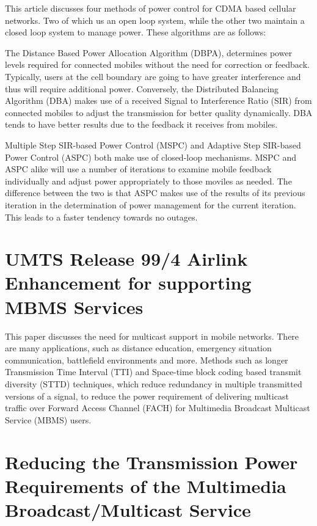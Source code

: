 \documentclass[11pt]{article}
\begin{document}
This article discusses four methods of power control for CDMA based
cellular networks. Two of which us an open loop system, while the
other two maintain a closed loop system to manage power. These
algorithms are as follows:

The Distance Based Power Allocation Algorithm (DBPA), determines power
levels required for connected mobiles without the need for correction
or feedback. Typically, users at the cell boundary are going to have
greater interference and thus will require additional power.
Conversely, the Distributed Balancing Algorithm (DBA) makes use of a
received Signal to Interference Ratio (SIR) from connected mobiles to
adjust the transmission for better quality dynamically. DBA tends to
have better results due to the feedback it receives from mobiles.

Multiple Step SIR-based Power Control (MSPC) and Adaptive Step
SIR-based Power Control (ASPC) both make use of closed-loop
mechanisms. MSPC and ASPC alike will use a number of iterations to
examine mobile feedback individually and adjust power appropriately to
those moviles as needed. The difference between the two is that ASPC
makes use of the results of its previous iteration in the
determination of power management for the current iteration. This
leads to a faster tendency towards no outages.


\section{UMTS Release 99/4 Airlink Enhancement for supporting MBMS Services}
\label{sec-3}


This paper discusses the need for multicast support in mobile
networks. There are many applications, such as distance education,
emergency situation communication, battlefield environments and more.
Methods such as longer Transmission Time Interval (TTI) and Space-time
block coding based transmit diversity (STTD) techniques, which reduce
redundancy in multiple transmitted versions of a signal, to reduce the
power requirement of delivering multicast traffic over Forward Access
Channel (FACH) for Multimedia Broadcast Multicast Service (MBMS)
users.

        

\section{Reducing the Transmission Power Requirements of the Multimedia Broadcast/Multicast Service}
\label{sec-4}
\end{document}
